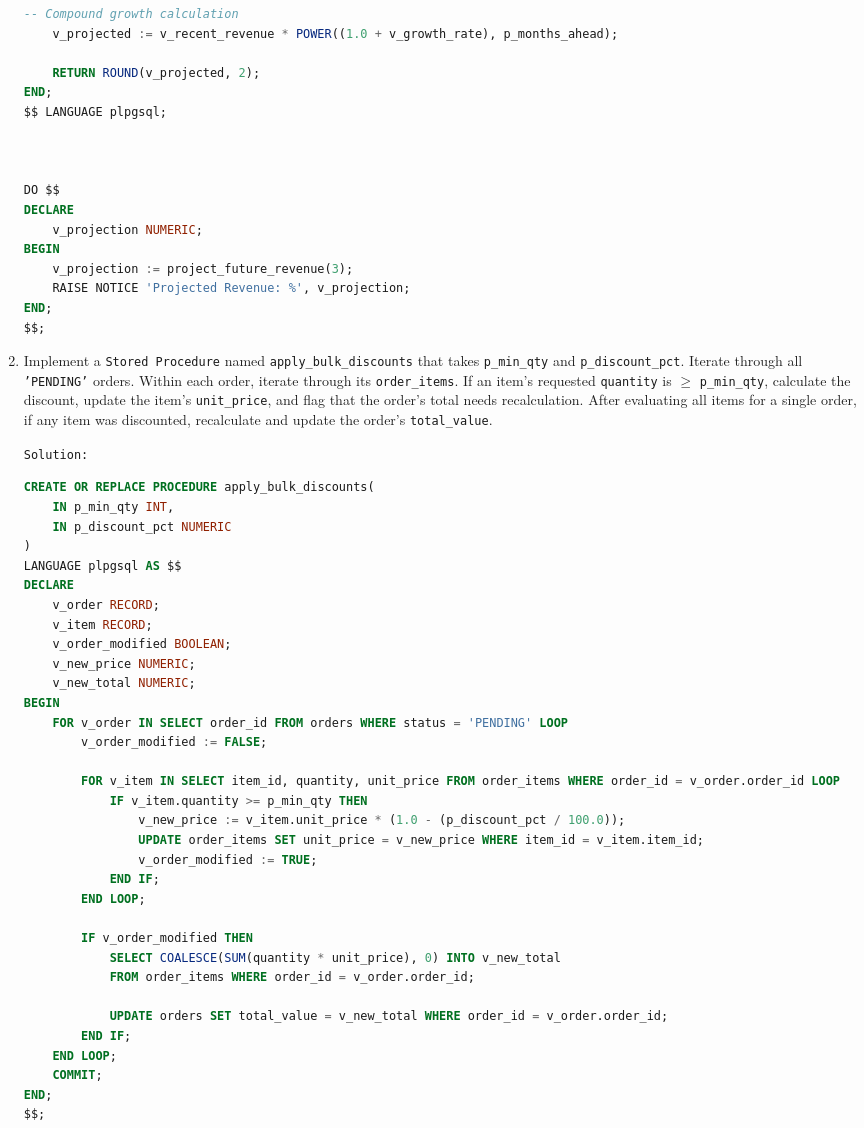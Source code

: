 \documentclass[12pt,a4paper]{article}
\newif\ifshowsolutions
\begin{document}
\begin{enumerate}
\begin{lstlisting}[language=SQL]
    -- Compound growth calculation
    v_projected := v_recent_revenue * POWER((1.0 + v_growth_rate), p_months_ahead);

    RETURN ROUND(v_projected, 2);
END;
$$ LANGUAGE plpgsql;



DO $$
DECLARE
    v_projection NUMERIC;
BEGIN
    v_projection := project_future_revenue(3);
    RAISE NOTICE 'Projected Revenue: %', v_projection;
END;
$$;


    \end{lstlisting}
    \fi
    \item Implement a \texttt{Stored Procedure} named \texttt{apply\_bulk\_discounts} that takes \texttt{p\_min\_qty} and \texttt{p\_discount\_pct}. Iterate through all \texttt{'PENDING'} orders. Within each order, iterate through its \texttt{order\_items}. If an item's requested \texttt{quantity} is $\geq$ \texttt{p\_min\_qty}, calculate the discount, update the item's \texttt{unit\_price}, and flag that the order's total needs recalculation. After evaluating all items for a single order, if any item was discounted, recalculate and update the order's \texttt{total\_value}.

    \ifshowsolutions
    \texttt{Solution:}
    \begin{lstlisting}[language=SQL]
CREATE OR REPLACE PROCEDURE apply_bulk_discounts(
    IN p_min_qty INT,
    IN p_discount_pct NUMERIC
)
LANGUAGE plpgsql AS $$
DECLARE
    v_order RECORD;
    v_item RECORD;
    v_order_modified BOOLEAN;
    v_new_price NUMERIC;
    v_new_total NUMERIC;
BEGIN
    FOR v_order IN SELECT order_id FROM orders WHERE status = 'PENDING' LOOP
        v_order_modified := FALSE;
        
        FOR v_item IN SELECT item_id, quantity, unit_price FROM order_items WHERE order_id = v_order.order_id LOOP
            IF v_item.quantity >= p_min_qty THEN
                v_new_price := v_item.unit_price * (1.0 - (p_discount_pct / 100.0));
                UPDATE order_items SET unit_price = v_new_price WHERE item_id = v_item.item_id;
                v_order_modified := TRUE;
            END IF;
        END LOOP;

        IF v_order_modified THEN
            SELECT COALESCE(SUM(quantity * unit_price), 0) INTO v_new_total
            FROM order_items WHERE order_id = v_order.order_id;
            
            UPDATE orders SET total_value = v_new_total WHERE order_id = v_order.order_id;
        END IF;
    END LOOP;
    COMMIT;
END;
$$;


\end{lstlisting}
\end{enumerate}
\end{document}
